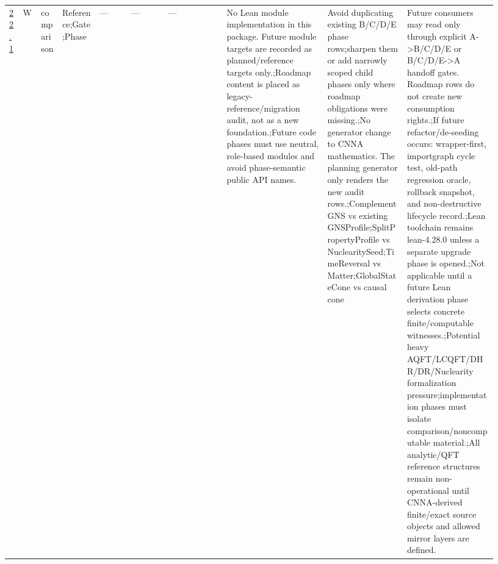 \begin{longtable}{L{0.026\linewidth} L{0.024\linewidth} L{0.045\linewidth} L{0.07\linewidth} L{0.065\linewidth} L{0.075\linewidth} L{0.11\linewidth} L{0.19\linewidth} L{0.155\linewidth} L{0.17\linewidth}}
\hline
\addlinespace[0.24em]
\hyperlink{phase-row-22-1}{22.1} & W & comparison & Reference;\newline Gate;\newline Phase & --- & --- & --- & No Lean module implementation in this package. Future module targets are recorded as planned/\allowbreak{}reference targets only.;\newline Roadmap content is placed as legacy-reference/\allowbreak{}migration audit, not as a new foundation.;\newline Future code phases must use neutral, role-based modules and avoid phase-semantic public API names. & Avoid duplicating existing B/\allowbreak{}C/\allowbreak{}D/\allowbreak{}E phase rows;\newline sharpen them or add narrowly scoped child phases only where roadmap obligations were missing.;\newline No generator change to CNNA mathematics. The planning generator only renders the new audit rows.;\newline ComplementGNS vs existing GNSProfile;\newline SplitPropertyProfile vs NuclearitySeed;\newline TimeReversal vs Matter;\newline GlobalStateCone vs causal cone & Future consumers may read only through explicit A->B/\allowbreak{}C/\allowbreak{}D/\allowbreak{}E or B/\allowbreak{}C/\allowbreak{}D/\allowbreak{}E->A handoff gates. Roadmap rows do not create new consumption rights.;\newline If future refactor/\allowbreak{}de-seeding occurs: wrapper-first, importgraph cycle test, old-path regression oracle, rollback snapshot, and non-destructive lifecycle record.;\newline Lean toolchain remains lean-4.28.0 unless a separate upgrade phase is opened.;\newline Not applicable until a future Lean derivation phase selects concrete finite/\allowbreak{}computable witnesses.;\newline Potential heavy AQFT/\allowbreak{}LCQFT/\allowbreak{}DHR/\allowbreak{}DR/\allowbreak{}Nuclearity formalization pressure;\newline implementation phases must isolate comparison/\allowbreak{}noncomputable material.;\newline All analytic/\allowbreak{}QFT reference structures remain non-operational until CNNA-derived finite/\allowbreak{}exact source objects and allowed mirror layers are defined.\\

\end{longtable}
